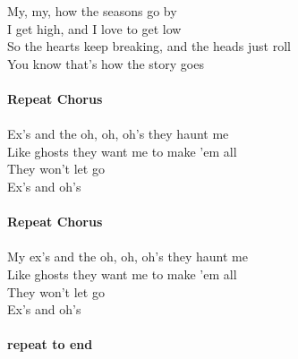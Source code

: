  My, my, how the seasons go  by      \\
 I get  high, and I  love to get  low\\
So the  hearts keep  breaking, and the  heads just  roll\\
 You know  that's how the story  goes   \\
\\
\textbf{Repeat Chorus}\\
\\
 Ex's and the  oh, oh, oh's they  haunt me\\
Like  ghosts they  want me to make 'em  all\\
They  won't let  go\\
Ex's and  oh's       \\
\\
\textbf{Repeat Chorus}\\
\\
My  ex's and the  oh, oh, oh's they  haunt me\\
Like  ghosts they  want me to make 'em  all\\
They  won't let  go\\
Ex's and  oh's       \\
\\
\textbf{repeat to end}
